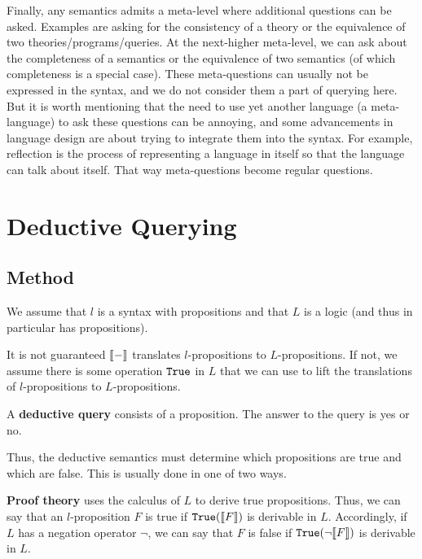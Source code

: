 \begin{remark}
Finally, any semantics admits a meta-level where additional questions can be asked.
Examples are asking for the consistency of a theory or the equivalence of two theories/programs/queries.
At the next-higher meta-level, we can ask about the completeness of a semantics or the equivalence of two semantics (of which completeness is a special case).
These meta-questions can usually not be expressed in the syntax, and we do not consider them a part of querying here.
But it is worth mentioning that the need to use yet another language (a meta-language) to ask these questions can be annoying, and some advancements in language design are about trying to integrate them into the syntax.
For example, reflection is the process of representing a language in itself so that the language can talk about itself.
That way meta-questions become regular questions.
\end{remark}


\section{Deductive Querying}\label{sec:bolquery:ded}

\subsection{Method}

We assume that $l$ is a syntax with propositions and that $L$ is a logic (and thus in particular has propositions).

It is not guaranteed $\llbracket -\rrbracket$ translates $l$-propositions to $L$-propositions.
If not, we assume there is some operation $\mathtt{True}$ in $L$ that we can use to lift the translations of $l$-propositions to $L$-propositions.

A \textbf{deductive query} consists of a proposition.
The answer to the query is yes or no.

Thus, the deductive semantics must determine which propositions are true and which are false.
This is usually done in one of two ways.

\textbf{Proof theory} uses the calculus of $L$ to derive true propositions.
Thus, we can say that an $l$-proposition $F$ is true if $\mathtt{True}(\llbracket F\rrbracket)$ is derivable in $L$.
Accordingly, if $L$ has a negation operator $\neg$, we can say that $F$ is false if $\mathtt{True}(\neg\llbracket F\rrbracket)$ is derivable in $L$.

